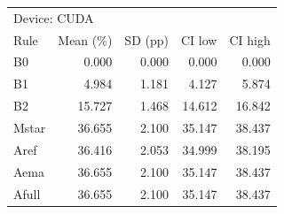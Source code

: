 \begin{tabular}{lrrrr}
\toprule
\multicolumn{5}{l}{Device: CUDA} \\
Rule & Mean (\%) & SD (pp) & CI low & CI high \\
\midrule
B0 & 0.000 & 0.000 & 0.000 & 0.000 \\
B1 & 4.984 & 1.181 & 4.127 & 5.874 \\
B2 & 15.727 & 1.468 & 14.612 & 16.842 \\
Mstar & 36.655 & 2.100 & 35.147 & 38.437 \\
Aref & 36.416 & 2.053 & 34.999 & 38.195 \\
Aema & 36.655 & 2.100 & 35.147 & 38.437 \\
Afull & 36.655 & 2.100 & 35.147 & 38.437 \\
\bottomrule
\end{tabular}
